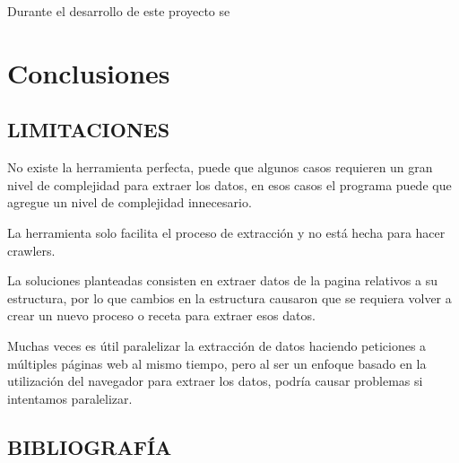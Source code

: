 \documentclass[12pt]{report}
\begin{document}
Durante el desarrollo de este proyecto se 



\chapter{Conclusiones}

\section[Limitaciones]{LIMITACIONES}

No existe la herramienta perfecta, puede que algunos casos requieren un gran nivel de complejidad para extraer los datos, en esos casos el programa puede que agregue un nivel de complejidad innecesario.

La herramienta solo facilita el proceso de extracción y no está hecha para hacer crawlers.

La soluciones planteadas consisten en extraer datos de la pagina relativos a su estructura, por lo que cambios en la estructura causaron que se requiera volver a crear un nuevo proceso o receta para extraer esos datos.

Muchas veces es útil paralelizar la extracción de datos haciendo peticiones a múltiples páginas web al mismo tiempo, pero al ser un enfoque basado en la utilización del navegador para extraer los datos, podría causar problemas si intentamos paralelizar.

\break

\section[Bibliografía]{BIBLIOGRAFÍA}

\nocite{*}



\break
\end{document}
